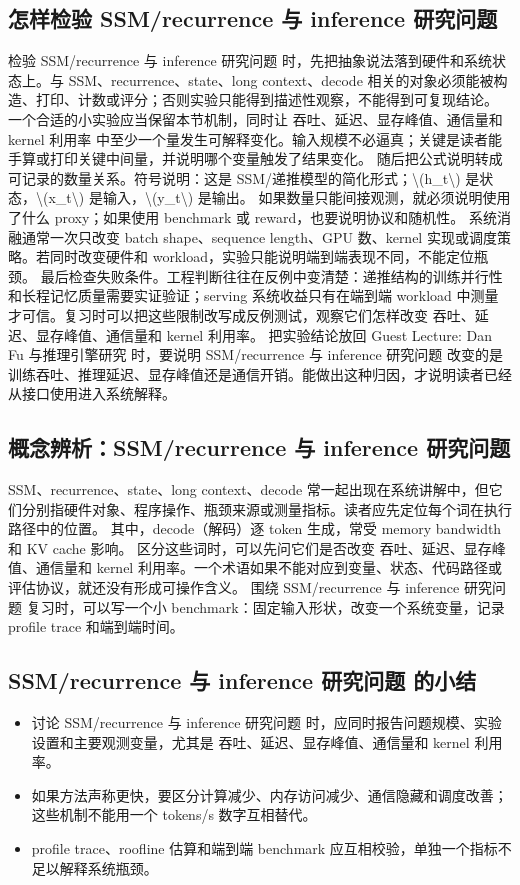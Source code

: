 \documentclass[a4paper]{article}
\begin{document}
\subsection{怎样检验 SSM/recurrence 与 inference 研究问题}
检验 SSM/recurrence 与 inference 研究问题 时，先把抽象说法落到硬件和系统状态上。与 SSM、recurrence、state、long context、decode 相关的对象必须能被构造、打印、计数或评分；否则实验只能得到描述性观察，不能得到可复现结论。
一个合适的小实验应当保留本节机制，同时让 吞吐、延迟、显存峰值、通信量和 kernel 利用率 中至少一个量发生可解释变化。输入规模不必逼真；关键是读者能手算或打印关键中间量，并说明哪个变量触发了结果变化。
随后把公式说明转成可记录的数量关系。符号说明：这是 SSM/递推模型的简化形式；\textbackslash{}(h\_t\textbackslash{}) 是状态，\textbackslash{}(x\_t\textbackslash{}) 是输入，\textbackslash{}(y\_t\textbackslash{}) 是输出。 如果数量只能间接观测，就必须说明使用了什么 proxy；如果使用 benchmark 或 reward，也要说明协议和随机性。
系统消融通常一次只改变 batch shape、sequence length、GPU 数、kernel 实现或调度策略。若同时改变硬件和 workload，实验只能说明端到端表现不同，不能定位瓶颈。
最后检查失败条件。工程判断往往在反例中变清楚：递推结构的训练并行性和长程记忆质量需要实证验证；serving 系统收益只有在端到端 workload 中测量才可信。复习时可以把这些限制改写成反例测试，观察它们怎样改变 吞吐、延迟、显存峰值、通信量和 kernel 利用率。
把实验结论放回 Guest Lecture: Dan Fu 与推理引擎研究 时，要说明 SSM/recurrence 与 inference 研究问题 改变的是训练吞吐、推理延迟、显存峰值还是通信开销。能做出这种归因，才说明读者已经从接口使用进入系统解释。
\subsection{概念辨析：SSM/recurrence 与 inference 研究问题}
SSM、recurrence、state、long context、decode 常一起出现在系统讲解中，但它们分别指硬件对象、程序操作、瓶颈来源或测量指标。读者应先定位每个词在执行路径中的位置。
其中，decode（解码）逐 token 生成，常受 memory bandwidth 和 KV cache 影响。
区分这些词时，可以先问它们是否改变 吞吐、延迟、显存峰值、通信量和 kernel 利用率。一个术语如果不能对应到变量、状态、代码路径或评估协议，就还没有形成可操作含义。
围绕 SSM/recurrence 与 inference 研究问题 复习时，可以写一个小 benchmark：固定输入形状，改变一个系统变量，记录 profile trace 和端到端时间。
\subsection{SSM/recurrence 与 inference 研究问题 的小结}
\begin{itemize}
\item 讨论 SSM/recurrence 与 inference 研究问题 时，应同时报告问题规模、实验设置和主要观测变量，尤其是 吞吐、延迟、显存峰值、通信量和 kernel 利用率。
\item 如果方法声称更快，要区分计算减少、内存访问减少、通信隐藏和调度改善；这些机制不能用一个 tokens/s 数字互相替代。
\item profile trace、roofline 估算和端到端 benchmark 应互相校验，单独一个指标不足以解释系统瓶颈。
\end{itemize}
\end{document}
